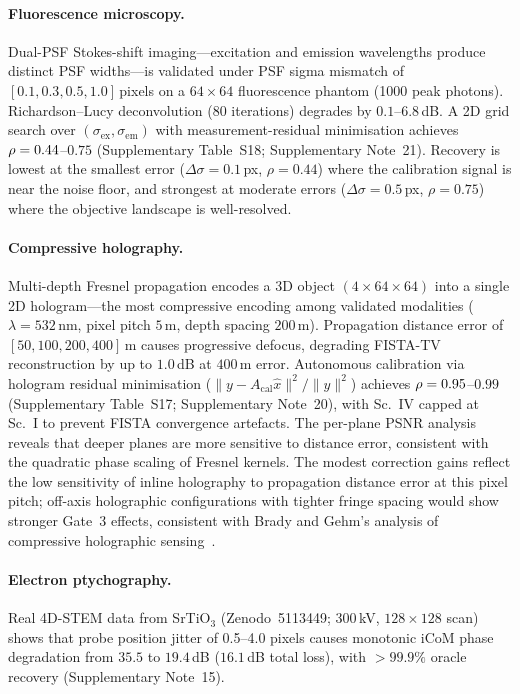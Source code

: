 \paragraph{Fluorescence microscopy.}
Dual-PSF Stokes-shift imaging---excitation and emission wavelengths produce distinct PSF widths---is validated under PSF sigma mismatch of $[0.1, 0.3, 0.5, 1.0]$\,pixels on a $64 \times 64$ fluorescence phantom (1000 peak photons). Richardson--Lucy deconvolution (80 iterations) degrades by $0.1$--$6.8$\,dB. A 2D grid search over $(\sigma_{\mathrm{ex}}, \sigma_{\mathrm{em}})$ with measurement-residual minimisation achieves $\rho = 0.44$--$0.75$ (Supplementary Table~S18; Supplementary Note~21). Recovery is lowest at the smallest error ($\Delta\sigma = 0.1$\,px, $\rho = 0.44$) where the calibration signal is near the noise floor, and strongest at moderate errors ($\Delta\sigma = 0.5$\,px, $\rho = 0.75$) where the objective landscape is well-resolved.

\paragraph{Compressive holography.}
Multi-depth Fresnel propagation encodes a 3D object $(4 \times 64 \times 64)$ into a single 2D hologram---the most compressive encoding among validated modalities ($\lambda = 532$\,nm, pixel pitch $5$\,\textmu m, depth spacing $200$\,\textmu m). Propagation distance error of $[50, 100, 200, 400]$\,\textmu m causes progressive defocus, degrading FISTA-TV reconstruction by up to $1.0$\,dB at $400$\,\textmu m error. Autonomous calibration via hologram residual minimisation ($\|y - A_{\mathrm{cal}}\hat{x}\|^2 / \|y\|^2$) achieves $\rho = 0.95$--$0.99$ (Supplementary Table~S17; Supplementary Note~20), with Sc.~IV capped at Sc.~I to prevent FISTA convergence artefacts. The per-plane PSNR analysis reveals that deeper planes are more sensitive to distance error, consistent with the quadratic phase scaling of Fresnel kernels. The modest correction gains reflect the low sensitivity of inline holography to propagation distance error at this pixel pitch; off-axis holographic configurations with tighter fringe spacing would show stronger Gate~3 effects, consistent with Brady and Gehm's analysis of compressive holographic sensing~\cite{brady2009compressive}.

\paragraph{Electron ptychography.}
Real 4D-STEM data from SrTiO$_3$ (Zenodo~5113449; 300\,kV, $128 \times 128$ scan) shows that probe position jitter of 0.5--4.0 pixels causes monotonic iCoM phase degradation from $35.5$ to $19.4$\,dB ($16.1$\,dB total loss), with $>99.9\%$ oracle recovery (Supplementary Note~15).

